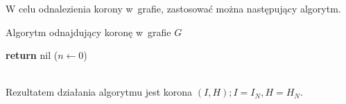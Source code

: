 W celu odnalezienia korony w~grafie, zastosować można następujący algorytm.
\begin{algorithm}
  \caption{Algorytm odnajdujący koronę w~grafie $G$}\label{alg_findCrown}
  \begin{algorithmic}[1]
    \State\textbf{return} nil
  \EndIf
\EndIf
{}
\State($n \leftarrow 0$)
\label{findCrown_while}
\label{findCrown_makeH}
\label{findCrown_makeI}
\EndWhile
{}
  \EndFunction
\end{algorithmic}
\end{algorithm}\\
Rezultatem działania algorytmu jest korona $(I,H); I=I_N, H=H_N$.

